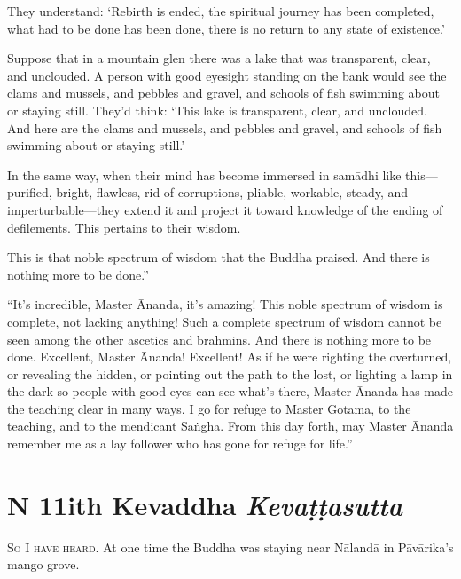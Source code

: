 \documentclass[12pt,openany]{book}%
\newcommand*{\suttatitleacronym}[1]{\smaller[2]{#1}\vspace*{.3em}}
\newcommand*{\suttatitletranslation}[1]{\linebreak{#1}}
\newcommand*{\suttatitleroot}[1]{\linebreak\smaller[2]\itshape{#1}}
\newcommand*{\tocacronym}[1]{\hspace*{-3.3em}{#1}\quad}
\newcommand*{\toctranslation}[1]{#1}
\newcommand*{\tocroot}[1]{(\textit{#1})}
\newcommand*{\scevam}[1]{\textsc{#1}}
\begin{document}
They understand: ‘Rebirth is ended, the spiritual journey has been completed, what had to be done has been done, there is no return to any state of existence.’ 

Suppose that in a mountain glen there was a lake that was transparent, clear, and unclouded. A person with good eyesight standing on the bank would see the clams and mussels, and pebbles and gravel, and schools of fish swimming about or staying still. They’d think: ‘This lake is transparent, clear, and unclouded. And here are the clams and mussels, and pebbles and gravel, and schools of fish swimming about or staying still.’ 

In the same way, when their mind has become immersed in \textsanskrit{samādhi} like this—purified, bright, flawless, rid of corruptions, pliable, workable, steady, and imperturbable—they extend it and project it toward knowledge of the ending of defilements. This pertains to their wisdom. 

This is that noble spectrum of wisdom that the Buddha praised. And there is nothing more to be done.” 

“It’s incredible, Master Ānanda, it’s amazing! This noble spectrum of wisdom is complete, not lacking anything! Such a complete spectrum of wisdom cannot be seen among the other ascetics and brahmins. And there is nothing more to be done. Excellent, Master Ānanda! Excellent! As if he were righting the overturned, or revealing the hidden, or pointing out the path to the lost, or lighting a lamp in the dark so people with good eyes can see what’s there, Master Ānanda has made the teaching clear in many ways. I go for refuge to Master Gotama, to the teaching, and to the mendicant \textsanskrit{Saṅgha}. From this day forth, may Master Ānanda remember me as a lay follower who has gone for refuge for life.” 

%
\chapter*{{\suttatitleacronym DN 11}{\suttatitletranslation With Kevaddha }{\suttatitleroot Kevaṭṭasutta}}
\addcontentsline{toc}{chapter}{\tocacronym{DN 11} \toctranslation{With Kevaddha } \tocroot{Kevaṭṭasutta}}

\scevam{So I have heard. }At one time the Buddha was staying near \textsanskrit{Nālandā} in \textsanskrit{Pāvārika}’s mango grove. 
\end{document}

